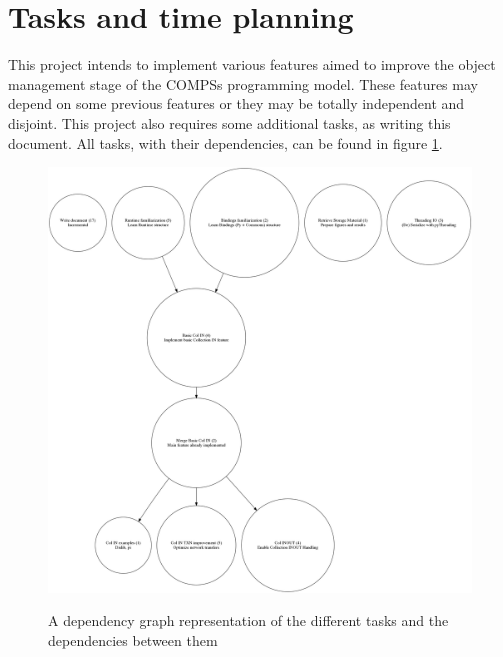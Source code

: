 \section{Tasks and time planning}
\label{sec:tasks_and_time_planning}
This project intends to implement various features aimed to improve the object management stage of the COMPSs programming model. These features may depend on some previous features or they may be totally independent and disjoint. This project also requires some additional tasks, as writing this document. All tasks, with their dependencies, can be found in figure \ref{fig:thesis_task_graph}.

\begin{figure}[ht!]
\centering
\includegraphics[scale = 0.25]{figures/thesis_task_graph.png}
\label{fig:thesis_task_graph}
\caption{A dependency graph representation of the different tasks and the dependencies between them}
\end{figure}
